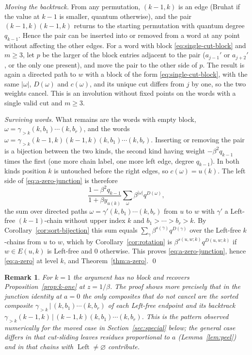 \documentclass[11pt]{article}
\newtheorem{remark}[proposition]{Remark}
\newcommand{\Left}{\operatorname{Left}}
\begin{document}
\emph{Moving the backtrack.}
From any permutation, $(k-1,k)$ is an edge (Bruhat if the value at
$k-1$ is smaller, quantum otherwise), and the pair
$(k-1,k)(k-1,k)$ returns to the starting permutation with quantum
degree $q_{k-1}$. Hence the pair can be inserted into or removed from
a word at any point without affecting the other edges. For a word
with block \eqref{eq:single-cut-block} and $m\geq3$, let $p$ be the
larger of the block entries adjacent to the pair ($a_{j-1}'$ or
$a_{j+2}'$, or the only one present), and move the pair to the other
side of $p$. The result is again a directed path to $w$ with a block
of the form \eqref{eq:single-cut-block}, with the same $|\omega|$,
$D(\omega)$ and $c(\omega)$, and its unique cut differs from $j$ by
one, so the two weights cancel. This is an involution without fixed
points on the words with a single valid cut and $m\geq3$.

\emph{Surviving words.}
What remains are the words with empty block,
$\omega=\gamma_{>k}(k,b_1)\cdots(k,b_r)$, and the words
$\omega=\gamma_{>k}(k-1,k)(k-1,k)(k,b_1)\cdots(k,b_r)$. Inserting or
removing the pair is a bijection between the two kinds, the second
kind having weight $-\beta^2q_{k-1}$ times the first (one more chain
label, one more left edge, degree $q_{k-1}$). In both kinds position
$k$ is untouched before the right edges, so $c(\omega)=u(k)$. The
left side of \eqref{eq:a-zero-junction} is therefore
\[
 \frac{1-\beta^2q_{k-1}}{1+\beta y_{u(k)}}
 \sum_{\omega}\beta^{|\omega|}q^{D(\omega)},
\]
the sum over directed paths $\omega=\gamma'(k,b_1)\cdots(k,b_r)$ from
$u$ to $w$ with $\gamma'$ a Left-free $(k-1)$-chain without upper
index $k$ and $b_1>\cdots>b_r>k$. By
Corollary~\ref{cor:sort-bijection} this sum equals
$\sum_\gamma\beta^{s(\gamma)}q^{D(\gamma)}$ over the Left-free
$k$-chains from $u$ to $w$, which by Corollary~\ref{cor:rotation} is
$\beta^{s(u,w;k)}q^{D(u,w;k)}$ if $w\in E(u,k)$ is Left-free and $0$
otherwise. This proves \eqref{eq:a-zero-junction}, hence
\eqref{eq:a-zero} at level $k$, and Theorem~\ref{thm:a-zero}. \qed

\begin{remark}
For $k=1$ the argument has no block and recovers
Proposition~\ref{prop:k-one} at $z=1/\beta$. The proof shows more
precisely that in the junction identity at $a=0$ the only composites
that do not cancel are the sorted composite
$\gamma_{>k}\,\big|\,(k,b_1)\cdots(k,b_r)$ of each Left-free endpoint
and its backtrack $\gamma_{>k}(k-1,k)\,\big|\,(k-1,k)(k,b_1)\cdots(k,b_r)$.
This is the pattern observed numerically for the moved case in
Section~\ref{sec:special} below; the general case differs in that
cut-sliding leaves residues proportional to $a$ (Lemma~\ref{lem:peel})
and in that chains with $\Left\neq\varnothing$ contribute.
\end{remark}
\end{document}
